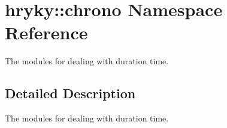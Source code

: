 \hypertarget{namespacehryky_1_1chrono}{\section{hryky\-:\-:chrono Namespace Reference}
\label{namespacehryky_1_1chrono}
}


The modules for dealing with duration time.  




\subsection{Detailed Description}
The modules for dealing with duration time. 